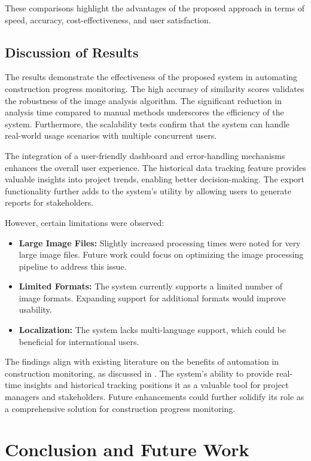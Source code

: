 \documentclass[12pt,a4paper]{report}
\begin{document}
These comparisons highlight the advantages of the proposed approach in terms of speed, accuracy, cost-effectiveness, and user satisfaction.

\section{Discussion of Results}
The results demonstrate the effectiveness of the proposed system in automating construction progress monitoring. The high accuracy of similarity scores validates the robustness of the image analysis algorithm. The significant reduction in analysis time compared to manual methods underscores the efficiency of the system. Furthermore, the scalability tests confirm that the system can handle real-world usage scenarios with multiple concurrent users.

The integration of a user-friendly dashboard and error-handling mechanisms enhances the overall user experience. The historical data tracking feature provides valuable insights into project trends, enabling better decision-making. The export functionality further adds to the system's utility by allowing users to generate reports for stakeholders.

However, certain limitations were observed:
\begin{itemize}
    \item \textbf{Large Image Files:} Slightly increased processing times were noted for very large image files. Future work could focus on optimizing the image processing pipeline to address this issue.
    \item \textbf{Limited Formats:} The system currently supports a limited number of image formats. Expanding support for additional formats would improve usability.
    \item \textbf{Localization:} The system lacks multi-language support, which could be beneficial for international users.
\end{itemize}

The findings align with existing literature on the benefits of automation in construction monitoring, as discussed in \cite{Sample2023}. The system's ability to provide real-time insights and historical tracking positions it as a valuable tool for project managers and stakeholders. Future enhancements could further solidify its role as a comprehensive solution for construction progress monitoring.

\chapter{Conclusion and Future Work}
\end{document}
